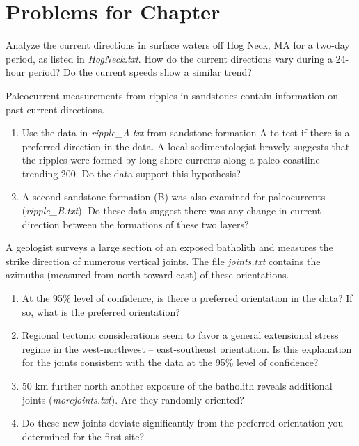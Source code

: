 \clearpage
\section{Problems for Chapter \thechapter}

\begin{problem}
	Analyze the current directions in surface waters off Hog Neck, MA for a two-day period, as listed in \emph{HogNeck.txt}.
	How do the current directions vary during a 24-hour period?  Do the current speeds show a similar trend?
\end{problem}
	
\begin{problem}
	Paleocurrent measurements from ripples in sandstones contain information on past current directions.
	\begin{enumerate}[label=\alph*)]
	\item Use the data in \emph{ripple\_A.txt} from sandstone formation A to test if there is a preferred direction in the data.  A
	local sedimentologist bravely suggests that the ripples were formed by long-shore currents along a paleo-coastline
	trending 200\DS.  Do the data support this hypothesis?
	\item A second sandstone formation (B) was also examined for paleocurrents (\emph{ripple\_B.txt}).
	Do these data suggest there was any change in current direction between the formations
	of these two layers?
	\end{enumerate}
\end{problem}

\begin{problem}
A geologist surveys a large section of an exposed batholith and measures the strike 
direction of numerous vertical joints.  The file \emph{joints.txt} contains the azimuths (measured from north toward east) 
of these orientations.

\begin{enumerate}[label=\alph*)]
\item At the 95\% level of confidence, is there a preferred orientation in the data?  If so, what is the 
preferred orientation?

\item Regional tectonic considerations seem to favor a general extensional stress regime in the west-northwest
-- east-southeast orientation.  Is this explanation for the joints consistent with the data 
at the 95\% level of confidence?

\item 50 km further north another exposure of the batholith reveals additional joints (\emph{morejoints.txt}).  Are 
they randomly oriented?

\item Do these new joints deviate significantly from the preferred orientation you determined for the first 
site?
\end{enumerate}
\end{problem}

